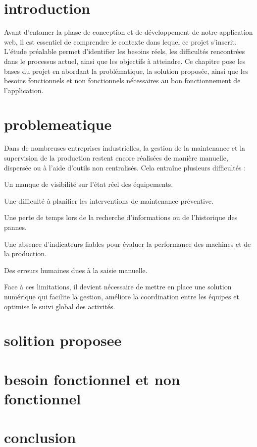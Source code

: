 \section{introduction}
Avant d’entamer la phase de conception et de développement de notre application web, il est essentiel de comprendre le contexte dans lequel ce projet s’inscrit. L’étude préalable permet d’identifier les besoins réels, les difficultés rencontrées dans le processus actuel, ainsi que les objectifs à atteindre.
Ce chapitre pose les bases du projet en abordant la problématique, la solution proposée, ainsi que les besoins fonctionnels et non fonctionnels nécessaires au bon fonctionnement de l’application.
\section{problemeatique}
Dans de nombreuses entreprises industrielles, la gestion de la maintenance et la supervision de la production restent encore réalisées de manière manuelle, dispersée ou à l’aide d’outils non centralisés.
Cela entraîne plusieurs difficultés :

Un manque de visibilité sur l’état réel des équipements.

Une difficulté à planifier les interventions de maintenance préventive.

Une perte de temps lors de la recherche d'informations ou de l’historique des pannes.

Une absence d’indicateurs fiables pour évaluer la performance des machines et de la production.

Des erreurs humaines dues à la saisie manuelle.

Face à ces limitations, il devient nécessaire de mettre en place une solution numérique qui facilite la gestion, améliore la coordination entre les équipes et optimise le suivi global des activités.
\section{solition proposee}
\section{besoin fonctionnel et non fonctionnel}
\section{conclusion}